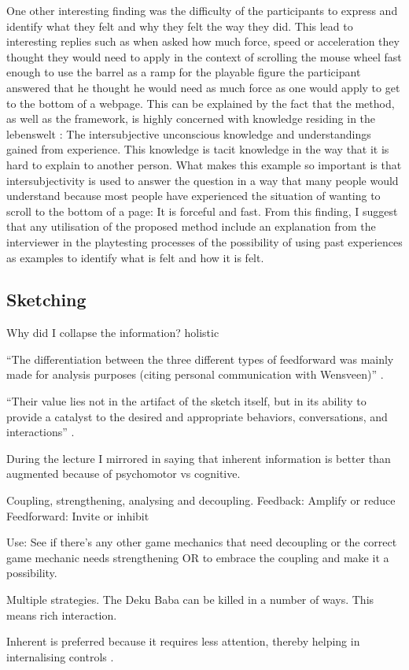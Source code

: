 One other interesting finding was the difficulty of the participants to express and identify what they felt and why they felt the way they did. This lead to interesting replies such as when asked how much force, speed or acceleration they thought they would need to apply in the context of scrolling the mouse wheel fast enough to use the barrel as a ramp for the playable figure the participant answered that he thought he would need as much force as one would apply to get to the bottom of a webpage. This can be explained by the fact that the method, as well as the framework, is highly concerned with knowledge residing in the lebenswelt \cite{dourish}: The intersubjective unconscious knowledge and understandings gained from experience. This knowledge is tacit knowledge in the way that it is hard to explain to another person. What makes this example so important is that intersubjectivity is used to answer the question in a way that many people would understand because most people have experienced the situation of wanting to scroll to the bottom of a page: It is forceful and fast. From this finding, I suggest that any utilisation of the proposed method include an explanation from the interviewer in the playtesting processes of the possibility of using past experiences as examples to identify what is felt and how it is felt.

\subsection{Sketching}
Why did I collapse the information? holistic

``The differentiation between the three different types of feedforward was mainly made for analysis purposes (citing personal communication with Wensveen)'' \cite[p. 5]{vermeulen}.

``Their value lies not in the artifact of the sketch itself, but in its ability to provide a catalyst to the desired and appropriate behaviors, conversations, and interactions'' \cite[p. 113]{buxton}.

During the lecture I mirrored \cite{frogger} in saying that inherent information is better than augmented because of psychomotor vs cognitive.


Coupling, strengthening, analysing and decoupling.
Feedback: Amplify or reduce
Feedforward: Invite or inhibit












Use: See if there's any other game mechanics that need decoupling or the correct game mechanic needs strengthening OR to embrace the coupling and make it a possibility.

 Multiple strategies. The Deku Baba can be killed in a number of ways. This means rich interaction.

 Inherent is preferred because it requires less attention, thereby helping in internalising controls \cite{calleja}.
